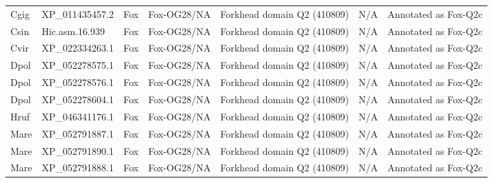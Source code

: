 \documentclass[../main.tex]{subfiles}
\begin{document}
\begin{landscape}
\begin{longtable}{lllllll}
		Cgig           & XP\_011435457.2       & Fox            & Fox-OG28/NA         & Forkhead domain Q2 (410809)                 & N/A                                                                    & Annotated as Fox-Q2c \\
		Csin           & Hic.asm.16.939        & Fox            & Fox-OG28/NA         & Forkhead domain Q2 (410809)                 & N/A                                                                    & Annotated as Fox-Q2c \\
		Cvir           & XP\_022334263.1       & Fox            & Fox-OG28/NA         & Forkhead domain Q2 (410809)                 & N/A                                                                    & Annotated as Fox-Q2c \\
		Dpol           & XP\_052278575.1       & Fox            & Fox-OG28/NA         & Forkhead domain Q2 (410809)                 & N/A                                                                    & Annotated as Fox-Q2c \\
		Dpol           & XP\_052278576.1       & Fox            & Fox-OG28/NA         & Forkhead domain Q2 (410809)                 & N/A                                                                    & Annotated as Fox-Q2c \\
		Dpol           & XP\_052278604.1       & Fox            & Fox-OG28/NA         & Forkhead domain Q2 (410809)                 & N/A                                                                    & Annotated as Fox-Q2c \\
		Hruf           & XP\_046341176.1       & Fox            & Fox-OG28/NA         & Forkhead domain Q2 (410809)                 & N/A                                                                    & Annotated as Fox-Q2c \\
		Mare           & XP\_052791887.1       & Fox            & Fox-OG28/NA         & Forkhead domain Q2 (410809)                 & N/A                                                                    & Annotated as Fox-Q2c \\
		Mare           & XP\_052791890.1       & Fox            & Fox-OG28/NA         & Forkhead domain Q2 (410809)                 & N/A                                                                    & Annotated as Fox-Q2c \\
		Mare           & XP\_052791888.1       & Fox            & Fox-OG28/NA         & Forkhead domain Q2 (410809)                 & N/A                                                                    & Annotated as Fox-Q2c \\

\end{longtable}
\end{landscape}
\end{document}
